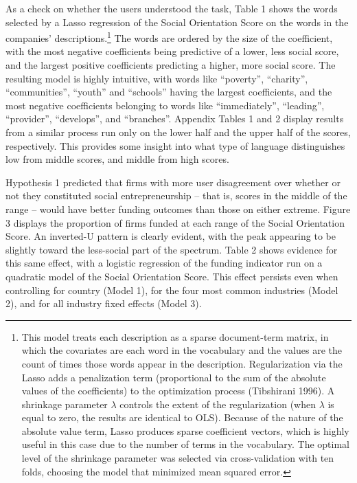 \documentclass[12pt]{article}
\begin{document}
As a check on whether the users understood the task, Table 1 shows the words selected by a Lasso regression of the Social Orientation Score on the words in the companies' descriptions.\footnote{This model treats each description as a sparse document-term matrix, in which the covariates are each word in the vocabulary and the values are the count of times those words appear in the description. Regularization via the Lasso adds a penalization term (proportional to the sum of the absolute values of the coefficients) to the optimization process (Tibshirani 1996). A shrinkage parameter $\lambda$ controls the extent of the regularization (when $\lambda$ is equal to zero, the results are identical to OLS). Because of the nature of the absolute value term, Lasso produces sparse coefficient vectors, which is highly useful in this case due to the number of terms in the vocabulary.  The optimal level of the shrinkage parameter was selected via cross-validation with ten folds, choosing the model that minimized mean squared error.} The words are ordered by the size of the coefficient, with the most negative coefficients being predictive of a lower, less social score, and the largest positive coefficients predicting a higher, more social score. The resulting model is highly intuitive, with words like ``poverty'', ``charity'', ``communities'', ``youth'' and ``schools'' having the largest coefficients, and the most negative coefficients belonging to words like ``immediately'', ``leading'', ``provider'', ``develops'', and ``branches''. Appendix Tables 1 and 2 display results from a similar process run only on the lower half and the upper half of the scores, respectively. This provides some insight into what type of language distinguishes low from middle scores, and middle from high scores.

Hypothesis 1 predicted that firms with more user disagreement over whether or not they constituted social entrepreneurship -- that is, scores in the middle of the range -- would have better funding outcomes than those on either extreme. Figure 3 displays the proportion of firms funded at each range of the Social Orientation Score. An inverted-U pattern is clearly evident, with the peak appearing to be slightly toward the less-social part of the spectrum. Table 2 shows evidence for this same effect, with a logistic regression of the funding indicator run on a quadratic model of the Social Orientation Score. This effect persists even when controlling for country (Model 1), for the four most common industries (Model 2), and for all industry fixed effects (Model 3). 
\end{document}
